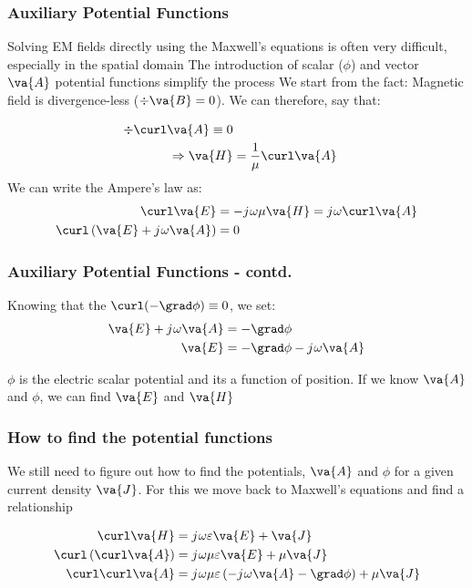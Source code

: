 \documentclass[10pt, compress]{beamer}
\renewcommand{\O}{\omega}  %
\newcommand{\E}{\varepsilon}  %
\renewcommand{\u}{\mu}  %
\renewcommand{\j}{{j}\mkern1mu} %
\begin{document}
\begin{frame}
  \frametitle{Auxiliary Potential Functions}
  \begin{outline}
    \1 Solving EM fields directly using the Maxwell's equations is often very difficult, especially in the spatial domain
    \1 The introduction of scalar (${\phi}$) and vector $\va{A}$ potential functions simplify the process
    \1 We start from the fact:
    \2 Magnetic field is divergence-less ($\div \va{B} = 0$). We can therefore, say that:
  \end{outline}
  \begin{align*}
    \div \curl \va{A} \equiv 0 \\
    \Rightarrow \va{H} &= \frac{1}{\u} \curl \va{A}
  \end{align*}
  We can write the Ampere's law as:
  \begin{align*}
    \curl \va{E} &= - \j \O \u \va{H} = \j \O \curl \va{A} \\
    \curl \left (\va{E} + \j \O \va{A} \right) &= 0
  \end{align*}
\end{frame}

\begin{frame}
  \frametitle{Auxiliary Potential Functions - contd.}
  Knowing that the $\curl (-\grad \phi) \equiv 0 $, we set:
  \begin{align*}
    \va{E} + \j \O \va{A} &= -\grad \phi \\
    \va{E} &= -\grad \phi - \j \O \va{A}
  \end{align*}
\begin{outline}
  \1 $\phi$ is the electric scalar potential and its a function of position.
  \1 If we know $\va{A}$ and $\phi$, we can find $\va{E}$ and $\va{H}$
\end{outline}
\end{frame}



\begin{frame}
  \frametitle{How to find the potential functions}

  \begin{outline}
    \1 We still need to figure out how to find the potentials,   $\va{A}$ and $\phi$ for a given current density $\va{J}$.
    \1 For this we move back to Maxwell's equations and find a relationship
  \end{outline}
\begin{align*}
     \curl \va{H} &= \j \O \E \va{E} + \va{J} \\
     \curl \left( \curl \va{A} \right) &= \j \O \u \E \va{E} + \u \va{J} \\
     \curl \curl \va{A} &= \j \O \u \E \left(-\j \O \va{A} - \grad \phi \right) + \u \va{J}
\end{align*}
\end{frame}
\end{document}
